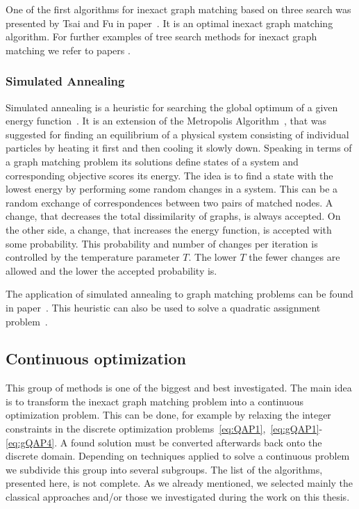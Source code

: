 One of the first algorithms for inexact graph matching based on three search was presented by Tsai and Fu in paper~\cite{Fu1979}. It is an optimal inexact graph matching algorithm. For further examples of tree search methods for inexact graph matching we refer to papers \cite{Bunke1983_inexactGM,Shapiro1981,Wang1995}.
\subsubsection{Simulated Annealing}
Simulated annealing is a heuristic for searching the global optimum of a given energy function~\cite{Burkard98thequadratic}. It is an extension of the Metropolis Algorithm~\cite{Metropolis}, that was suggested for finding an equilibrium of a physical system consisting of individual particles by heating it first and then cooling it slowly down. Speaking in terms of a graph matching problem its solutions define states of a system and corresponding objective scores its energy. The idea is to find a state with the lowest energy by performing some random changes in a system. This can be a random exchange of correspondences between two pairs of matched nodes. A change, that decreases the total dissimilarity of graphs, is always accepted. On the other side, a change, that increases the energy function, is accepted with some probability. This probability and number of changes per iteration is controlled by the temperature parameter $T$. The lower $T$ the fewer changes are allowed and the lower the accepted probability is. 

The application of simulated annealing to graph matching problems can be found in paper~\cite{Herault1990_SimulatedAnnealing}. This heuristic can also be used to solve a quadratic assignment problem~\cite{Burkard98thequadratic}.
\subsection{Continuous optimization}
This group of methods is one of the biggest and best investigated. The main idea is to transform the inexact graph matching problem into a continuous optimization problem. This can be done, for example by relaxing the integer constraints in the discrete optimization problems~\eqref{eq:QAP1},~\eqref{eq:gQAP1}-\eqref{eq:gQAP4}. A found solution must be converted afterwards back onto the discrete domain. Depending on techniques applied to solve a continuous problem we subdivide this group into several subgroups. The list of the algorithms, presented here, is not complete. As we already mentioned, we selected mainly the classical approaches and/or those we investigated during the work on this thesis.

